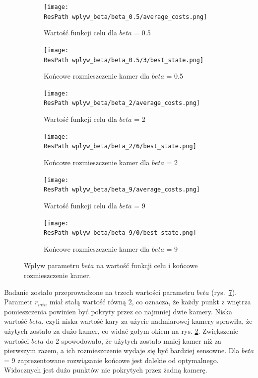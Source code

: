 \documentclass[12pt,a4paper]{article}
\newcommand{\ResPath}{../badania/}
\begin{document}
\afterpage{\clearpage}
\begin{figure}[p]
\captionsetup[subfigure]{aboveskip=-3pt,belowskip=-1pt}
  \begin{subfigure}[b]{0.5\linewidth}
    \centering
    \texttt{[image: \\ResPath wplyw\_beta/beta\_0.5/average\_costs.png]}
    \caption{Wartość funkcji celu dla $beta$ = 0.5}
    \label{fig_beta:a}
  \end{subfigure}%
  \begin{subfigure}[b]{0.5\linewidth}
    \centering
    \texttt{[image: \\ResPath wplyw\_beta/beta\_0.5/3/best\_state.png]}
    \caption{Końcowe rozmieszczenie kamer dla $beta$ = 0.5}
    \label{fig_beta:b}
  \end{subfigure}
  \begin{subfigure}[b]{0.5\linewidth}
    \centering
    \texttt{[image: \\ResPath wplyw\_beta/beta\_2/average\_costs.png]}
    \caption{Wartość funkcji celu dla $beta$ = 2}
    \label{fig_beta:c}
  \end{subfigure}%
  \begin{subfigure}[b]{0.5\linewidth}
    \centering
    \texttt{[image: \\ResPath wplyw\_beta/beta\_2/6/best\_state.png]}
    \caption{Końcowe rozmieszczenie kamer dla $beta$ = 2}
    \label{fig_beta:d}
  \end{subfigure}
    \begin{subfigure}[b]{0.5\linewidth}
    \centering
    \texttt{[image: \\ResPath wplyw\_beta/beta\_9/average\_costs.png]}
    \caption{Wartość funkcji celu dla $beta$ = 9}
    \label{fig_beta:c}
  \end{subfigure}%
  \begin{subfigure}[b]{0.5\linewidth}
    \centering
    \texttt{[image: \\ResPath wplyw\_beta/beta\_9/0/best\_state.png]}
    \caption{Końcowe rozmieszczenie kamer dla $beta$ = 9}
    \label{fig_beta:d}
  \end{subfigure}
  \caption{Wpływ parametru $beta$ na wartość funkcji celu i końcowe rozmieszczenie kamer.}
  \label{fig_beta}
\end{figure}
\restoregeometry
Badanie zostało przeprowadzone na trzech wartości parametru $beta$
(rys.\ \ref{fig_beta}). Parametr $r_{min}$ miał stałą wartość równą 2,
co oznacza, że każdy punkt z wnętrza pomieszczenia powinien być pokryty
przez co najmniej dwie kamery. Niska wartość $beta$, czyli niska wartość
kary za użycie nadmiarowej kamery sprawiła, że użytych zostało za dużo
kamer, co widać gołym okiem na rys. \ref{fig_beta:b}. Zwiększenie wartości
$beta$ do 2 spowodowało, że użytych zostało mniej kamer niż za pierwszym razem,
a ich rozmieszczenie wydaje się być bardziej sensowne. Dla $beta$ = 9 zaprezentowane
rozwiązanie końcowe jest dalekie od optymalnego. Widocznych jest dużo punktów
nie pokrytych przez żadną kamerę.
\end{document}
